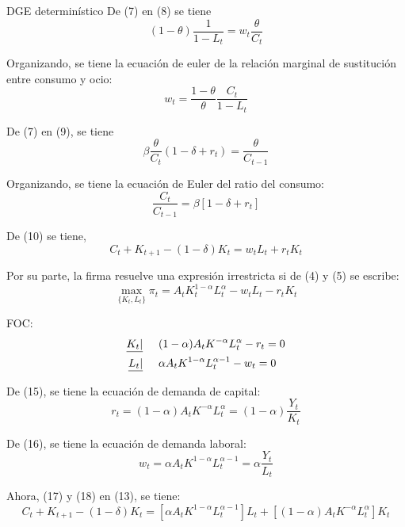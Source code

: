 \documentclass[letterpaper, 11pt]{extarticle}
\begin{document}
\begin{problem}{DGE determinístico}{}
De (7) en (8) se tiene
\begin{equation*}
    (1-\theta)\dfrac{1}{1-L_t}=w_t\dfrac{\theta}{C_t}
\end{equation*}

Organizando, se tiene la ecuación de euler de la relación marginal de sustitución entre consumo y ocio:
\begin{equation}
    w_t=\dfrac{1-\theta}{\theta}\dfrac{C_t}{1-L_t}
\end{equation}

De (7) en (9), se tiene
\begin{equation*}
    \beta \dfrac{\theta}{C_t}(1-\delta+r_t)=\dfrac{\theta}{C_{t-1}}
\end{equation*}

Organizando, se tiene la ecuación de Euler del ratio del consumo:
\begin{equation}
    \dfrac{C_t}{C_{t-1}}=\beta[1-\delta+r_t]
\end{equation}

De (10) se tiene,
\begin{equation}
    C_t+K_{t+1}-(1-\delta)K_t=w_tL_t+r_tK_t
\end{equation}

Por su parte, la firma resuelve una expresión irrestricta si de (4) y (5) se escribe:
\begin{equation}
    \underset{\{K_t,L_t\}}{\max} \pi_t=A_tK_t^{1-\alpha}L_t^{\alpha}-w_tL_t-r_tK_t
\end{equation}

FOC:
\begin{align}
    \underline{K_t|} & \hspace{.5cm} (1-\alpha)A_tK^{-\alpha}L_t^{\alpha}-r_t=0 \\
    \underline{L_t|} & \hspace{.5cm} \alpha A_tK^{1-\alpha}L_t^{\alpha-1}-w_t=0
\end{align}

De (15), se tiene la ecuación de demanda de capital:
\begin{equation}
    r_t=(1-\alpha)A_tK^{-\alpha}L_t^{\alpha}=(1-\alpha)\dfrac{Y_t}{K_t}
\end{equation}

De (16), se tiene la ecuación de demanda laboral:
\begin{equation}
    w_t=\alpha A_tK^{1-\alpha}L_t^{\alpha-1}=\alpha\dfrac{Y_t}{L_t}
\end{equation}

Ahora, (17) y (18) en (13), se tiene:
$$C_t+K_{t+1}-(1-\delta)K_t=\left[\alpha A_tK^{1-\alpha}L_t^{\alpha-1}\right]L_t+\left[(1-\alpha)A_tK^{-\alpha}L_t^{\alpha}\right]K_t$$


\end{problem}
\end{document}
